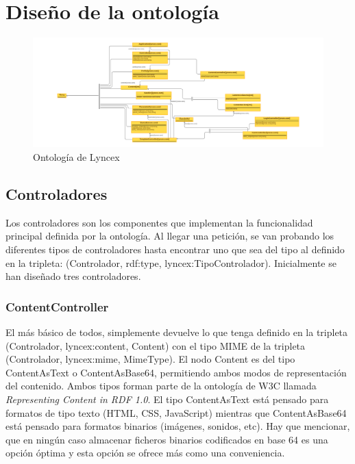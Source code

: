 \documentclass[12pt]{report} %
\begin{document}
\section{Diseño de la ontología}

\begin{figure}
    \centering
    \includegraphics[width=\textwidth]{lyncex.png}
    \caption{Ontología de Lyncex}
    \label{fig:ontologia}
\end{figure}

\subsection{Controladores}
Los controladores son los componentes que implementan la funcionalidad principal definida por la ontología.
Al llegar una petición, se van probando los diferentes tipos de controladores hasta encontrar uno que sea del tipo al definido en la tripleta: (Controlador, rdf:type, lyncex:TipoControlador).
Inicialmente se han diseñado tres controladores.

\subsubsection{ContentController}
El más básico de todos, simplemente devuelve lo que tenga definido en la tripleta (Controlador, lyncex:content, Content) con el tipo MIME 
de la tripleta (Controlador, lyncex:mime, MimeType). El nodo Content es del tipo ContentAsText o ContentAsBase64, permitiendo ambos modos de representación del contenido.
Ambos tipos forman parte de la ontología de W3C llamada \textit{Representing Content in RDF 1.0}\cite{cnt}.
El tipo ContentAsText está pensado para formatos de tipo texto (HTML, CSS, JavaScript) mientras que ContentAsBase64 está pensado para formatos binarios (imágenes, sonidos, etc).
Hay que mencionar, que en ningún caso almacenar ficheros binarios codificados en base 64 es una opción óptima y esta opción se ofrece más como una conveniencia.
\end{document}
